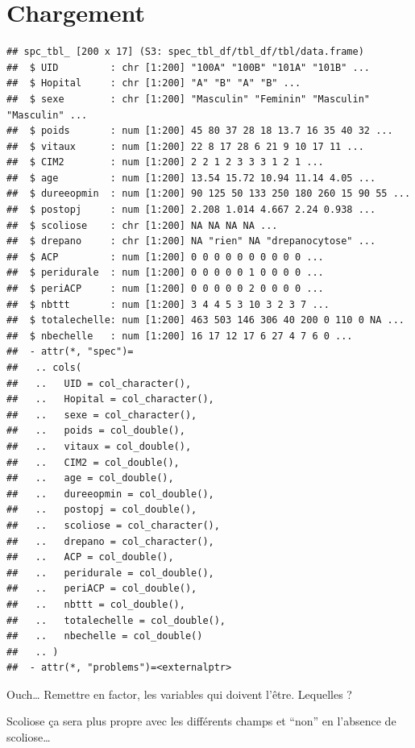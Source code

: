 \documentclass[
]{book}
\newenvironment{Shaded}{\begin{snugshade}}{\end{snugshade}}
\newcommand{\FunctionTok}[1]{\textcolor[rgb]{0.13,0.29,0.53}{\textbf{#1}}}
\newcommand{\NormalTok}[1]{#1}
\newcommand{\OtherTok}[1]{\textcolor[rgb]{0.56,0.35,0.01}{#1}}
\newcommand{\SpecialCharTok}[1]{\textcolor[rgb]{0.81,0.36,0.00}{\textbf{#1}}}
\newcommand{\StringTok}[1]{\textcolor[rgb]{0.31,0.60,0.02}{#1}}
\begin{document}
\section{Chargement}\label{chargement}

\begin{verbatim}
## spc_tbl_ [200 x 17] (S3: spec_tbl_df/tbl_df/tbl/data.frame)
##  $ UID         : chr [1:200] "100A" "100B" "101A" "101B" ...
##  $ Hopital     : chr [1:200] "A" "B" "A" "B" ...
##  $ sexe        : chr [1:200] "Masculin" "Feminin" "Masculin" "Masculin" ...
##  $ poids       : num [1:200] 45 80 37 28 18 13.7 16 35 40 32 ...
##  $ vitaux      : num [1:200] 22 8 17 28 6 21 9 10 17 11 ...
##  $ CIM2        : num [1:200] 2 2 1 2 3 3 3 1 2 1 ...
##  $ age         : num [1:200] 13.54 15.72 10.94 11.14 4.05 ...
##  $ dureeopmin  : num [1:200] 90 125 50 133 250 180 260 15 90 55 ...
##  $ postopj     : num [1:200] 2.208 1.014 4.667 2.24 0.938 ...
##  $ scoliose    : chr [1:200] NA NA NA NA ...
##  $ drepano     : chr [1:200] NA "rien" NA "drepanocytose" ...
##  $ ACP         : num [1:200] 0 0 0 0 0 0 0 0 0 0 ...
##  $ peridurale  : num [1:200] 0 0 0 0 0 1 0 0 0 0 ...
##  $ periACP     : num [1:200] 0 0 0 0 0 2 0 0 0 0 ...
##  $ nbttt       : num [1:200] 3 4 4 5 3 10 3 2 3 7 ...
##  $ totalechelle: num [1:200] 463 503 146 306 40 200 0 110 0 NA ...
##  $ nbechelle   : num [1:200] 16 17 12 17 6 27 4 7 6 0 ...
##  - attr(*, "spec")=
##   .. cols(
##   ..   UID = col_character(),
##   ..   Hopital = col_character(),
##   ..   sexe = col_character(),
##   ..   poids = col_double(),
##   ..   vitaux = col_double(),
##   ..   CIM2 = col_double(),
##   ..   age = col_double(),
##   ..   dureeopmin = col_double(),
##   ..   postopj = col_double(),
##   ..   scoliose = col_character(),
##   ..   drepano = col_character(),
##   ..   ACP = col_double(),
##   ..   peridurale = col_double(),
##   ..   periACP = col_double(),
##   ..   nbttt = col_double(),
##   ..   totalechelle = col_double(),
##   ..   nbechelle = col_double()
##   .. )
##  - attr(*, "problems")=<externalptr>
\end{verbatim}

Ouch\ldots{} Remettre en factor, les variables qui doivent l'être. Lequelles ?

Scoliose ça sera plus propre avec les différents champs et ``non'' en l'absence
de scoliose\ldots{}

\begin{Shaded}
\end{Shaded}
\end{document}
